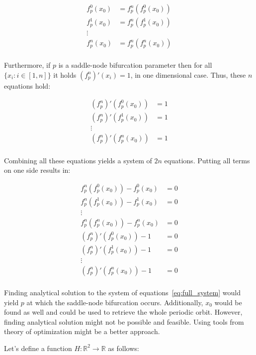 \begin{align*} 
f_{p}^{0}(x_0) &= f_{p}^{n}(f_{p}^{0}(x_0)) \\
f_{p}^{1}(x_0) &= f_{p}^{n}(f_{p}^{1}(x_0)) \\
\vdots \\
f_{p}^{n}(x_0) &= f_{p}^{n}(f_{p}^{n}(x_0)) \\
\end{align*}

Furthermore, if $p$ is a saddle-node bifurcation parameter then for all $\{ x_{i}: i \in [1, n] \}$ it holds $(f_{p}^{n})'(x_i) = 1$, in one dimensional case.
Thus, these $n$ equations hold:

\begin{align*} 
(f_{p}^{n})'(f_{p}^{0}(x_0)) &= 1 \\
(f_{p}^{n})'(f_{p}^{1}(x_0)) &= 1 \\
\vdots \\
(f_{p}^{n})'(f_{p}^{n}(x_0)) &= 1 \\
\end{align*}

Combining all these equations yields a system of $2n$ equations.
Putting all terms on one side results in:

\begin{equation}
\label{eq:full_system}
\begin{aligned} 
f_{p}^{n}(f_{p}^{0}(x_0)) - f_{p}^{0}(x_0) &= 0 \\
f_{p}^{n}(f_{p}^{1}(x_0)) - f_{p}^{1}(x_0) &= 0 \\
\vdots \\
f_{p}^{n}(f_{p}^{n}(x_0)) - f_{p}^{n}(x_0) &= 0 \\
(f_{p}^{n})'(f_{p}^{0}(x_0)) - 1 &= 0 \\
(f_{p}^{n})'(f_{p}^{1}(x_0)) - 1 &= 0 \\
\vdots \\
(f_{p}^{n})'(f_{p}^{n}(x_0)) - 1 &= 0 \\
\end{aligned}
\end{equation}

Finding analytical solution to the system of equations~\eqref{eq:full_system} would yield $p$ at which the saddle-node bifurcation occurs.
Additionally, $x_0$ would be found as well and could be used to retrieve the whole periodic orbit.
However, finding analytical solution might not be possible and feasible.
Using tools from theory of optimization might be a better approach.
\par
Let's define a function $H: \mathbb{R}^{2} \rightarrow \mathbb{R}$ as follows:

